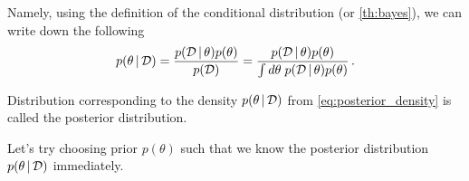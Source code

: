Namely, using the definition of the conditional distribution (or \cref{th:bayes}), we can write down the following
\begin{align}
\label{eq:posterior_density}
    p(\theta \,|\, \mathcal{D}) = \frac{p(\mathcal{D} \,|\, \theta)p(\theta)}{p(\mathcal{D})} = \frac{p(\mathcal{D} \,|\, \theta)p(\theta)}{\int d\theta\; p(\mathcal{D} \,|\, \theta)p(\theta)}\,.
\end{align}
\begin{mybox}
\begin{definition}\label{def:posterior}
    Distribution corresponding to the density $p(\theta \,|\, \mathcal{D})$ from \cref{eq:posterior_density} is called the posterior distribution.
\end{definition}
\end{mybox}

Let's try choosing prior $p(\theta)$ such that we know the posterior distribution $p(\theta\,|\, \mathcal{D})$ immediately.

